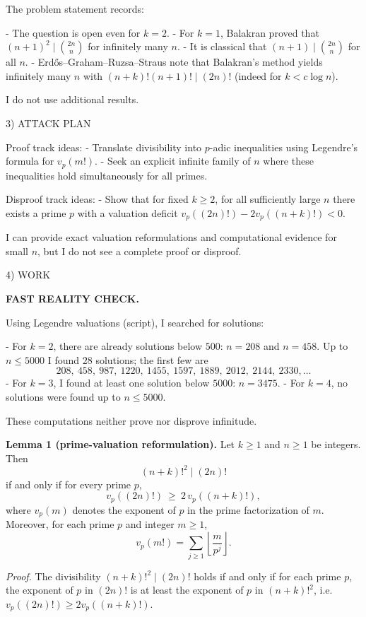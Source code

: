 The problem statement records:

- The question is open even for $k=2$.
- For $k=1$, Balakran proved that $(n+1)^2\mid \binom{2n}{n}$ for infinitely many $n$.
- It is classical that $(n+1)\mid \binom{2n}{n}$ for all $n$.
- Erd\H{o}s--Graham--Ruzsa--Straus note that Balakran's method yields infinitely many $n$ with $(n+k)!(n+1)!\mid (2n)!$ (indeed for $k<c\log n$).

I do not use additional results.

3) ATTACK PLAN

Proof track ideas:
- Translate divisibility into $p$-adic inequalities using Legendre's formula for $v_p(m!)$.
- Seek an explicit infinite family of $n$ where these inequalities hold simultaneously for all primes.

Disproof track ideas:
- Show that for fixed $k\ge 2$, for all sufficiently large $n$ there exists a prime $p$ with a valuation deficit $v_p((2n)!)-2v_p((n+k)!)<0$.

I can provide exact valuation reformulations and computational evidence for small $n$, but I do not see a complete proof or disproof.

4) WORK

\textbf{FAST REALITY CHECK.}

Using Legendre valuations (script), I searched for solutions:

- For $k=2$, there are already solutions below $500$: $n=208$ and $n=458$.
  Up to $n\le 5000$ I found $28$ solutions; the first few are
  \[
  208,\ 458,\ 987,\ 1220,\ 1455,\ 1597,\ 1889,\ 2012,\ 2144,\ 2330,\dots
  \]
- For $k=3$, I found at least one solution below $5000$: $n=3475$.
- For $k=4$, no solutions were found up to $n\le 5000$.

These computations neither prove nor disprove infinitude.

\medskip

\textbf{Lemma 1 (prime-valuation reformulation).}
Let $k\ge 1$ and $n\ge 1$ be integers. Then
\[
(n+k)!^2 \mid (2n)!
\]
if and only if for every prime $p$,
\[
 v_p((2n)!) \ \ge\ 2\,v_p((n+k)!),
\]
where $v_p(m)$ denotes the exponent of $p$ in the prime factorization of $m$.
Moreover, for each prime $p$ and integer $m\ge 1$,
\[
 v_p(m!) = \sum_{j\ge 1} \left\lfloor \frac{m}{p^j}\right\rfloor.
\]

\emph{Proof.}
The divisibility $(n+k)!^2\mid (2n)!$ holds if and only if for each prime $p$, the exponent of $p$ in $(2n)!$ is at least the exponent of $p$ in $(n+k)!^2$, i.e.
$v_p((2n)!)\ge 2v_p((n+k)!)$.

